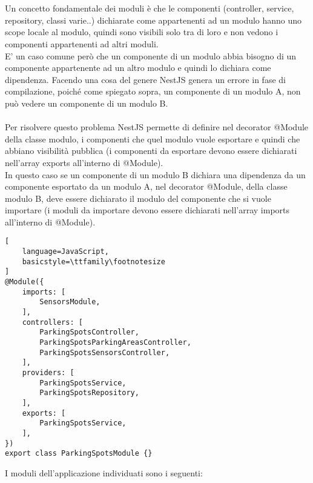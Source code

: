 \\\\
Un concetto fondamentale dei moduli è che le componenti (controller, service, repository, classi varie..) dichiarate 
come appartenenti ad un modulo hanno uno scope locale al modulo, quindi sono visibili solo tra di loro e non vedono
i componenti appartenenti ad altri moduli.
\\
E' un caso comune però che un componente di un modulo abbia bisogno di un componente appartenente ad un altro modulo
e quindi lo dichiara come dipendenza. Facendo una cosa del genere NestJS genera un errore in fase di compilazione, poiché come 
spiegato sopra, un componente di un modulo A, non può vedere un componente di un modulo B.
\\\\
Per risolvere questo problema NestJS permette di definire nel decorator @Module della classe modulo, i componenti che
quel modulo vuole esportare e quindi che abbiano visibilità pubblica (i componenti da esportare devono essere dichiarati 
nell'array exports all'interno di @Module). 
\\
In questo caso se un componente di un modulo B dichiara una 
dipendenza da un componente esportato da un modulo A, nel decorator @Module, della classe modulo B, deve essere dichiarato il
modulo del componente che si vuole importare (i moduli da importare devono essere dichiarati nell'array imports all'interno di @Module).
\\
\begin{lstlisting}[
    language=JavaScript,
    basicstyle=\ttfamily\footnotesize
]
@Module({
    imports: [ 
        SensorsModule,
    ],
    controllers: [
        ParkingSpotsController, 
        ParkingSpotsParkingAreasController,
        ParkingSpotsSensorsController,
    ],
    providers: [
        ParkingSpotsService,
        ParkingSpotsRepository,
    ],
    exports: [
        ParkingSpotsService,
    ],
})
export class ParkingSpotsModule {}
\end{lstlisting}
\leavevmode\newline
I moduli dell'applicazione individuati sono i seguenti:
